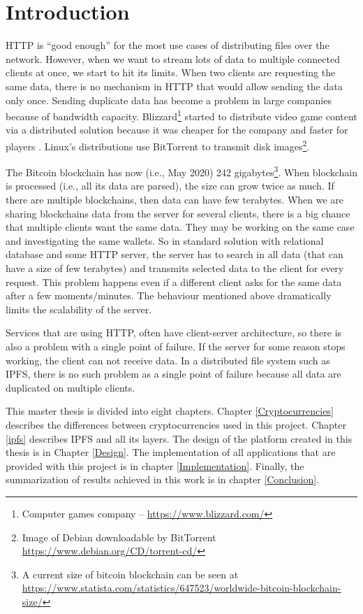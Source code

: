 \chapter{Introduction}


HTTP is ``good enough'' for the most use cases of distributing files over the network. However, when we want to stream lots of data to multiple connected clients at once, we start to hit its limits. When two clients are requesting the same data, there is no mechanism in HTTP that would allow sending the data only once. Sending duplicate data has become a problem in large companies because of bandwidth capacity. Blizzard\footnote{Computer games company -- \url{https://www.blizzard.com/}} started to distribute video game content via a distributed solution because it was cheaper for the company and faster for players \cite{BigDataInVideoGames}. Linux's distributions use BitTorrent to transmit disk images\footnote{Image of Debian downloadable by BitTorrent \url{https://www.debian.org/CD/torrent-cd/}}.

The Bitcoin blockchain has now (i.e., May 2020) 242 gigabytes\footnote{A current size of bitcoin blockchain can be seen at \url{https://www.statista.com/statistics/647523/worldwide-bitcoin-blockchain-size/}}. When blockchain is processed (i.e., all its data are parsed), the size can grow twice as much. If there are multiple blockchains, then data can have few terabytes. When we are sharing blockchains data from the server for several clients, there is a big chance that multiple clients want the same data. They may be working on the same case and investigating the same wallets. So in standard solution with relational database and some HTTP server, the server has to search in all data (that can have a size of few terabytes) and transmits selected data to the client for every request. This problem happens even if a different client asks for the same data after a few moments/minutes. The behaviour mentioned above dramatically limits the scalability of the server.

Services that are using HTTP, often have client-server architecture, so there is also a problem with a single point of failure. If the server for some reason stops working, the client can not receive data. In a distributed file system such as IPFS, there is no such problem as a single point of failure because all data are duplicated on multiple clients.

This master thesis is divided into eight chapters. Chapter \ref{Cryptocurrencies} describes the differences between cryptocurrencies used in this project. Chapter \ref{ipfs} describes IPFS and all its layers. The design of the platform created in this thesis is in Chapter \ref{Design}. The implementation of all applications that are provided with this project is in chapter \ref{Implementation}. Finally, the summarization of results achieved in this work is in chapter \ref{Conclusion}.
